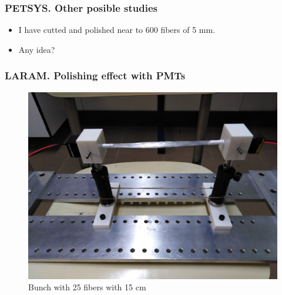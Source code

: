 \documentclass{beamer}
\begin{document}
\begin{frame}
\frametitle{PETSYS. Other posible studies}

\begin{itemize}
\item{} I have cutted and polished near to 600 fibers of 5 mm.
\item{} Any idea?
\end{itemize}

\end{frame}

\begin{frame}
\frametitle{LARAM. Polishing effect with PMTs}

\begin{figure}[hbtp]
\centering
\includegraphics[scale=0.06]{LARAM/Polishing_effect/Set_up_polish_LARAM.jpg}
\caption{Bunch with 25 fibers with 15 cm}
\end{figure}

\end{frame}
\end{document}

